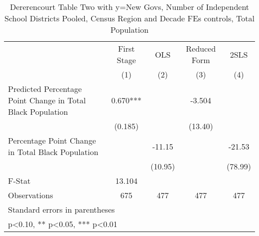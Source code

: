 \begin{table}[htbp]\centering
\def\sym#1{\ifmmode^{#1}\else\(^{#1}\)\fi}
\caption{Dererencourt Table Two with y=New Govs, Number of Independent School Districts  Pooled, Census Region and Decade FEs controls, Total Population}
\begin{tabular}{l*{4}{c}}
\toprule
                    & First Stage   &         OLS   &Reduced Form   &        2SLS   \\
                    &\multicolumn{1}{c}{(1)}   &\multicolumn{1}{c}{(2)}   &\multicolumn{1}{c}{(3)}   &\multicolumn{1}{c}{(4)}   \\
\midrule
Predicted Percentage Point Change in Total Black Population&       0.670***&               &      -3.504   &               \\
                    &     (0.185)   &               &     (13.40)   &               \\
\addlinespace
Percentage Point Change in Total Black Population&               &      -11.15   &               &      -21.53   \\
                    &               &     (10.95)   &               &     (78.99)   \\
\midrule
F-Stat              &      13.104   &               &               &               \\
Observations        &         675   &         477   &         477   &         477   \\
\bottomrule
\multicolumn{5}{l}{\footnotesize Standard errors in parentheses}\\
\multicolumn{5}{l}{\footnotesize * p<0.10, ** p<0.05, *** p<0.01}\\
\end{tabular}
\end{table}
